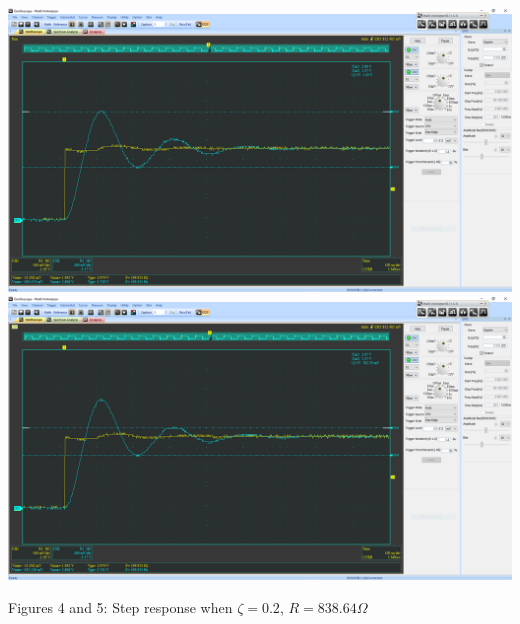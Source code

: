 \documentclass[12pt]{article}
\newcommand{\objects}[2]{%
  \leavevmode\vbox{\hbox{#1}\nointerlineskip\hbox{#2}}%
}
\begin{document}
    \begin{center}
        \objects
            {\includegraphics[width=\textwidth]{4.4 (0.2) 1.png}}
            {\includegraphics[width=\textwidth]{4.4 (0.2) 2.png}}
    \end{center}
    \begin{center}
        Figures 4 and 5: Step response when $ \zeta = 0.2 $, $ R = 838.64 \Omega $
    \end{center}
    \newpage
\end{document}
